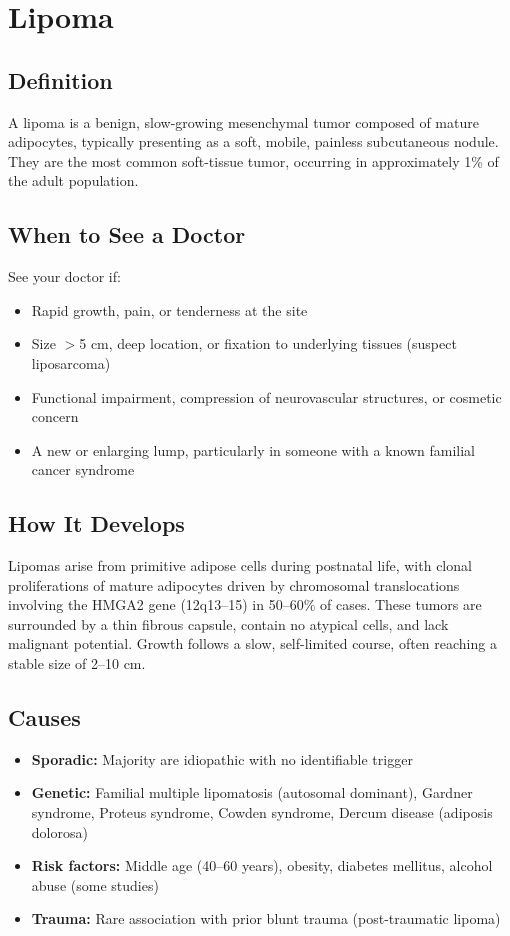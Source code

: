 \chapter{Lipoma}

\section*{Definition}
A lipoma is a benign, slow-growing mesenchymal tumor composed of mature adipocytes, typically presenting as a soft, mobile, painless subcutaneous nodule. They are the most common soft-tissue tumor, occurring in approximately 1\% of the adult population.

\section*{When to See a Doctor}
See your doctor if:
\begin{itemize}
  \item Rapid growth, pain, or tenderness at the site
  \item Size \ensuremath{>}5 cm, deep location, or fixation to underlying tissues (suspect liposarcoma)
  \item Functional impairment, compression of neurovascular structures, or cosmetic concern
  \item A new or enlarging lump, particularly in someone with a known familial cancer syndrome
\end{itemize}

\section*{How It Develops}
Lipomas arise from primitive adipose cells during postnatal life, with clonal proliferations of mature adipocytes driven by chromosomal translocations involving the HMGA2 gene (12q13--15) in 50--60\% of cases. These tumors are surrounded by a thin fibrous capsule, contain no atypical cells, and lack malignant potential. Growth follows a slow, self-limited course, often reaching a stable size of 2--10 cm.

\section*{Causes}
\begin{itemize}
  \item \textbf{Sporadic:} Majority are idiopathic with no identifiable trigger
  \item \textbf{Genetic:} Familial multiple lipomatosis (autosomal dominant), Gardner syndrome, Proteus syndrome, Cowden syndrome, Dercum disease (adiposis dolorosa)
  \item \textbf{Risk factors:} Middle age (40--60 years), obesity, diabetes mellitus, alcohol abuse (some studies)
  \item \textbf{Trauma:} Rare association with prior blunt trauma (post-traumatic lipoma)
\end{itemize}


